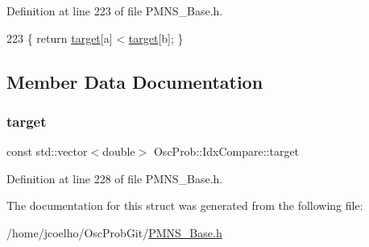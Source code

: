 Definition at line 223 of file P\+M\+N\+S\+\_\+\+Base.\+h.


\begin{DoxyCode}
223 \{ \textcolor{keywordflow}{return} \hyperlink{structOscProb_1_1IdxCompare_ab3258085f0afeb64bf472413bfed43ac}{target}[a] < \hyperlink{structOscProb_1_1IdxCompare_ab3258085f0afeb64bf472413bfed43ac}{target}[b]; \}
\end{DoxyCode}


\subsection{Member Data Documentation}
\mbox{\label{structOscProb_1_1IdxCompare_ab3258085f0afeb64bf472413bfed43ac}} 
\subsubsection{\texorpdfstring{target}{target}}
{\footnotesize\ttfamily const std\+::vector$<$double$>$ Osc\+Prob\+::\+Idx\+Compare\+::target\hspace{0.3cm}{\ttfamily [private]}}



Definition at line 228 of file P\+M\+N\+S\+\_\+\+Base.\+h.



The documentation for this struct was generated from the following file\+:\begin{DoxyCompactItemize}
\item 
/home/jcoelho/\+Osc\+Prob\+Git/\hyperlink{PMNS__Base_8h}{P\+M\+N\+S\+\_\+\+Base.\+h}\end{DoxyCompactItemize}
